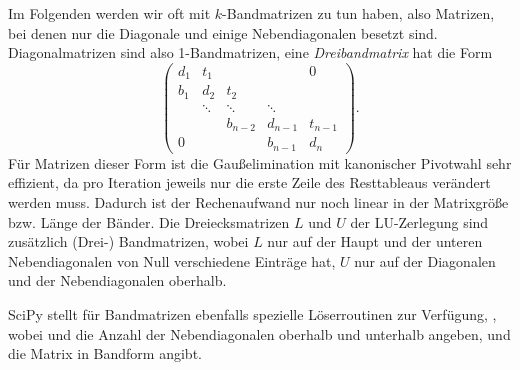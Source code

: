 Im Folgenden werden wir oft mit $k$-Bandmatrizen zu tun haben, also
Matrizen, bei denen nur die Diagonale und einige Nebendiagonalen
besetzt sind. Diagonalmatrizen sind also 1-Bandmatrizen, eine
\emph{Dreibandmatrix} hat die Form
\begin{equation}
  \begin{pmatrix}
    d_1 & t_1    &     & & 0 \\
    b_1 & d_2    & t_2 \\
    {}  & \ddots & \ddots & \ddots \\
    {}  &        & b_{n-2} & d_{n-1} & t_{n-1}\\
    0   &        &        & b_{n-1} & d_n
  \end{pmatrix}.
\end{equation}
Für Matrizen dieser Form ist die Gaußelimination mit kanonischer
Pivotwahl sehr effizient, da pro Iteration jeweils nur die erste Zeile
des Resttableaus verändert werden muss. Dadurch ist der Rechenaufwand
nur noch linear in der Matrixgröße bzw. Länge der Bänder. Die
Dreiecksmatrizen $L$ und $U$ der LU-Zerlegung sind zusätzlich
(Drei-) Bandmatrizen, wobei $L$ nur auf der Haupt und der unteren
Nebendiagonalen von Null verschiedene Einträge hat, $U$ nur auf der
Diagonalen und der Nebendiagonalen oberhalb.

SciPy stellt für Bandmatrizen ebenfalls spezielle Löserroutinen zur
Verfügung, ,
wobei  und  die Anzahl der Nebendiagonalen oberhalb
und unterhalb angeben, und  die Matrix in Bandform
angibt.

